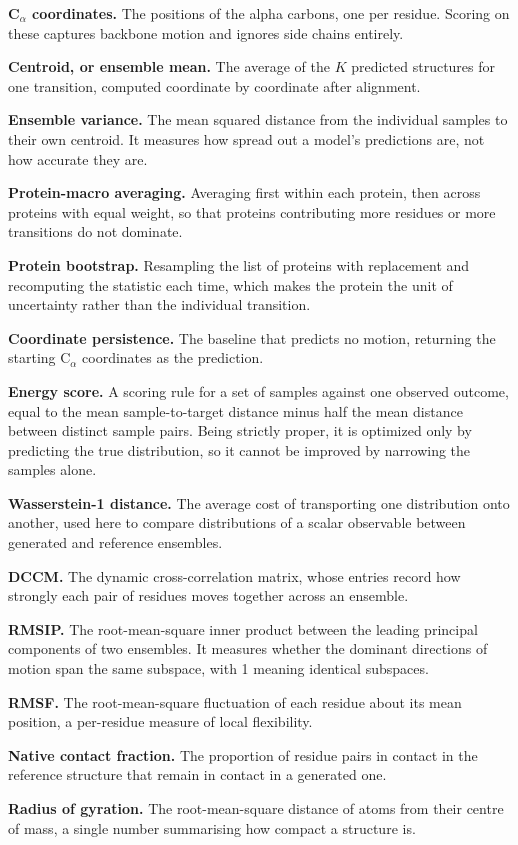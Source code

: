 \documentclass{article}
\newcommand{\CA}{C$_\alpha$}
\begin{document}
\textbf{\CA{} coordinates.} The positions of the alpha carbons, one per residue. Scoring on these captures backbone motion and ignores side chains entirely.

\textbf{Centroid, or ensemble mean.} The average of the $K$ predicted structures for one transition, computed coordinate by coordinate after alignment.

\textbf{Ensemble variance.} The mean squared distance from the individual samples to their own centroid. It measures how spread out a model's predictions are, not how accurate they are.

\textbf{Protein-macro averaging.} Averaging first within each protein, then across proteins with equal weight, so that proteins contributing more residues or more transitions do not dominate.

\textbf{Protein bootstrap.} Resampling the list of proteins with replacement and recomputing the statistic each time, which makes the protein the unit of uncertainty rather than the individual transition.

\textbf{Coordinate persistence.} The baseline that predicts no motion, returning the starting \CA{} coordinates as the prediction.

\textbf{Energy score.} A scoring rule for a set of samples against one observed outcome, equal to the mean sample-to-target distance minus half the mean distance between distinct sample pairs. Being strictly proper, it is optimized only by predicting the true distribution, so it cannot be improved by narrowing the samples alone.

\textbf{Wasserstein-1 distance.} The average cost of transporting one distribution onto another, used here to compare distributions of a scalar observable between generated and reference ensembles.

\textbf{DCCM.} The dynamic cross-correlation matrix, whose entries record how strongly each pair of residues moves together across an ensemble.

\textbf{RMSIP.} The root-mean-square inner product between the leading principal components of two ensembles. It measures whether the dominant directions of motion span the same subspace, with 1 meaning identical subspaces.

\textbf{RMSF.} The root-mean-square fluctuation of each residue about its mean position, a per-residue measure of local flexibility.

\textbf{Native contact fraction.} The proportion of residue pairs in contact in the reference structure that remain in contact in a generated one.

\textbf{Radius of gyration.} The root-mean-square distance of atoms from their centre of mass, a single number summarising how compact a structure is.


\end{document}

